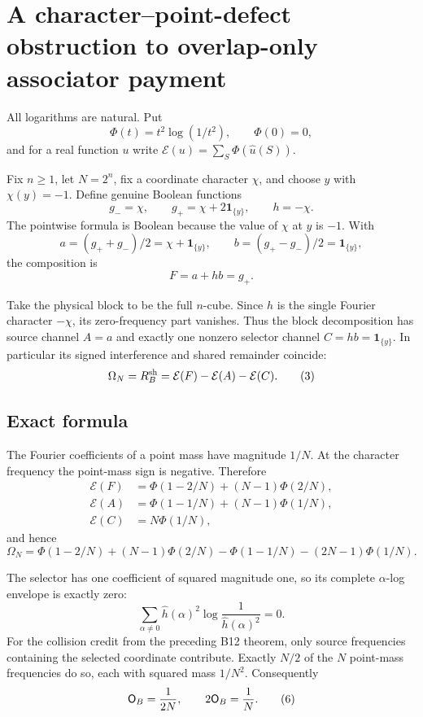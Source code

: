 \section*{A character--point-defect obstruction to overlap-only associator payment}

All logarithms are natural.  Put
\[
 \Phi(t)=t^2\log(1/t^2),\qquad \Phi(0)=0,
\]
and for a real function $u$ write
\(\mathcal E(u)=\sum_S\Phi(\widehat u(S))\).

Fix $n\geq1$, let $N=2^n$, fix a coordinate character $\chi$, and choose
$y$ with $\chi(y)=-1$.  Define genuine Boolean functions
\[
 g_- =\chi,\qquad g_+=\chi+2\mathbf1_{\{y\}},\qquad h=-\chi.
\tag{1}
\]
The pointwise formula is Boolean because the value of $\chi$ at $y$ is
$-1$.  With
\[
 a=(g_++g_-)/2=\chi+\mathbf1_{\{y\}},\qquad
 b=(g_+-g_-)/2=\mathbf1_{\{y\}},
\]
the composition is
\[
 F=a+hb=g_+.
\tag{2}
\]

Take the physical block to be the full $n$-cube.  Since $h$ is the single
Fourier character $-\chi$, its zero-frequency part vanishes.  Thus the
block decomposition has source channel $A=a$ and exactly one nonzero
selector channel $C=hb=\mathbf1_{\{y\}}$.  In particular its signed
interference and shared remainder coincide:
\[
 \Omega_N=R_B^{\rm sh}=\mathcal E(F)-\mathcal E(A)-\mathcal E(C).
\tag{3}
\]

\subsection*{Exact formula}

The Fourier coefficients of a point mass have magnitude $1/N$.  At the
character frequency the point-mass sign is negative.  Therefore
\[
\begin{aligned}
 \mathcal E(F)&=\Phi(1-2/N)+(N-1)\Phi(2/N),\\
 \mathcal E(A)&=\Phi(1-1/N)+(N-1)\Phi(1/N),\\
 \mathcal E(C)&=N\Phi(1/N),
\end{aligned}
\]
and hence
\[
 \boxed{\Omega_N=
 \Phi(1-2/N)+(N-1)\Phi(2/N)
 -\Phi(1-1/N)-(2N-1)\Phi(1/N).}
\tag{4}
\]

The selector has one coefficient of squared magnitude one, so its complete
$\alpha$-log envelope is exactly zero:
\[
 \sum_{\alpha\ne0}\widehat h(\alpha)^2
        \log\frac1{\widehat h(\alpha)^2}=0.
\tag{5}
\]
For the collision credit from the preceding B12 theorem, only source
frequencies containing the selected coordinate contribute.  Exactly $N/2$
of the $N$ point-mass frequencies do so, each with squared mass $1/N^2$.
Consequently
\[
 \mathsf O_B={1\over2N},\qquad 2\mathsf O_B={1\over N}.
\tag{6}
\]

